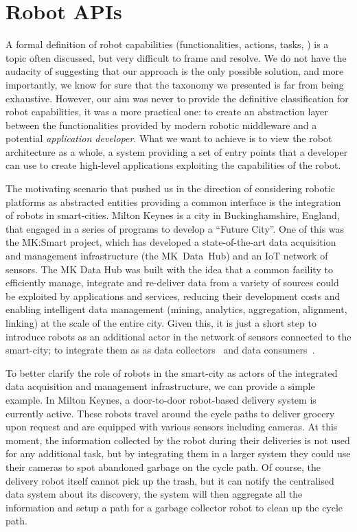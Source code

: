 \section{Robot APIs} 
A formal definition of robot capabilities (functionalities, actions, tasks, \etc) is a topic often discussed, but very difficult to frame and resolve. We do not have the audacity of suggesting that our approach is the only possible solution, and more importantly, we know for sure that the taxonomy we presented is far from being exhaustive. However, our aim was never to provide the definitive classification for robot capabilities, it was a more practical one: to create an abstraction layer between the functionalities provided by modern robotic middleware and a potential \textit{application developer}. What we want to achieve is to view the robot architecture as a whole, a system providing a set of entry points that a developer can use to create high-level applications exploiting the capabilities of the robot.

The motivating scenario that pushed us in the direction of considering robotic platforms as abstracted entities providing a common interface is the integration of robots in smart-cities. Milton Keynes is a city in Buckinghamshire, England, that engaged in a series of programs to develop a ``Future City''. One of this was the MK:Smart project, which has developed a state-of-the-art data acquisition and management infrastructure (the MK~Data~Hub) and an IoT network of sensors. The MK Data Hub was built with the idea that a common facility to efficiently manage, integrate and re-deliver data from a variety of sources could be exploited by applications and services, reducing their development costs and enabling intelligent data management (mining, analytics, aggregation, alignment, linking) at the scale of the entire city. Given this, it is just a short step to introduce robots as an additional actor in the network of sensors connected to the smart-city; to integrate them as as data collectors~\cite{tiddi2016update} and data consumers~\cite{daga2016addressing}.

To better clarify the role of robots in the smart-city as actors of the integrated data acquisition and management infrastructure, we can provide a simple example. In Milton Keynes, a door-to-door robot-based delivery system is currently active. These robots travel around the cycle paths to deliver grocery upon request and are equipped with various sensors including cameras. At this moment, the information collected by the robot during their deliveries is not used for any additional task, but by integrating them in a larger system they could use their cameras to spot abandoned garbage on the cycle path. Of course, the delivery robot itself cannot pick up the trash, but it can notify the centralised data system about its discovery, the system will then aggregate all the information and setup a path for a garbage collector robot to clean up the cycle path.

